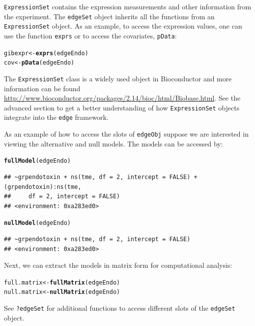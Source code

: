 \documentclass{article}\usepackage[]{graphicx}\usepackage[]{color}
\makeatletter
\newcommand{\hlstd}[1]{\textcolor[rgb]{0.345,0.345,0.345}{#1}}%
\newcommand{\hlkwb}[1]{\textcolor[rgb]{0.69,0.353,0.396}{#1}}%
\newcommand{\hlkwd}[1]{\textcolor[rgb]{0.737,0.353,0.396}{\textbf{#1}}}%
\newenvironment{kframe}{%
 \def\at@end@of@kframe{}%
 \ifinner\ifhmode%
  \def\at@end@of@kframe{\end{minipage}}%
  \begin{minipage}{\columnwidth}%
 \fi\fi%
 \def\FrameCommand##1{\hskip\@totalleftmargin \hskip-\fboxsep
 \colorbox{shadecolor}{##1}\hskip-\fboxsep
     \hskip-\linewidth \hskip-\@totalleftmargin \hskip\columnwidth}%
 \MakeFramed {\advance\hsize-\width
   \@totalleftmargin\z@ \linewidth\hsize
   \@setminipage}}%
 {\par\unskip\endMakeFramed%
 \at@end@of@kframe}
\newenvironment{knitrout}{}{} %
\makeatother
\begin{document}
{\tt ExpressionSet} contains the expression measurements and other information from the experiment. The {\tt edgeSet} object inherits all the functions from an {\tt ExpressionSet} object. As an example, to access the expression values, one can use the function {\tt exprs} or to access the covariates, {\tt pData}:
\begin{knitrout}
\color{fgcolor}\begin{kframe}
\begin{alltt}
\hlstd{gibexpr} \hlkwb{<-} \hlkwd{exprs}\hlstd{(edgeEndo)}
\hlstd{cov} \hlkwb{<-} \hlkwd{pData}\hlstd{(edgeEndo)}
\end{alltt}
\end{kframe}
\end{knitrout}
The {\tt ExpressionSet} class is a widely used object in Bioconductor and more information can be found \url{http://www.bioconductor.org/packages/2.14/bioc/html/Biobase.html}. See the advanced section to get a better understanding of how {\tt ExpressionSet} objects integrate into the {\tt edge} framework.

As an example of how to access the slots of {\tt edgeObj} suppose we are interested in viewing the alternative and null models. The models can be accessed by:
\begin{knitrout}
\color{fgcolor}\begin{kframe}
\begin{alltt}
\hlkwd{fullModel}\hlstd{(edgeEndo)}
\end{alltt}
\begin{verbatim}
## ~grpendotoxin + ns(tme, df = 2, intercept = FALSE) + (grpendotoxin):ns(tme, 
##     df = 2, intercept = FALSE)
## <environment: 0xa283ed0>
\end{verbatim}
\begin{alltt}
\hlkwd{nullModel}\hlstd{(edgeEndo)}
\end{alltt}
\begin{verbatim}
## ~grpendotoxin + ns(tme, df = 2, intercept = FALSE)
## <environment: 0xa283ed0>
\end{verbatim}
\end{kframe}
\end{knitrout}
Next, we can extract the models in matrix form for computational analysis:
\begin{knitrout}
\color{fgcolor}\begin{kframe}
\begin{alltt}
\hlstd{full.matrix} \hlkwb{<-} \hlkwd{fullMatrix}\hlstd{(edgeEndo)}
\hlstd{null.matrix} \hlkwb{<-} \hlkwd{nullMatrix}\hlstd{(edgeEndo)}
\end{alltt}
\end{kframe}
\end{knitrout}
See {\tt ?edgeSet} for additional functions to access different slots of the {\tt edgeSet} object. 
\end{document}

